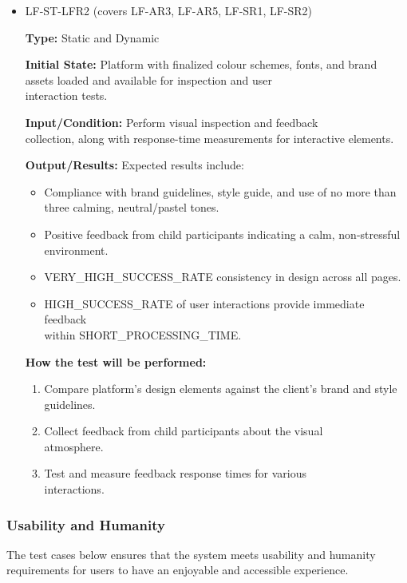 \documentclass[12pt, titlepage]{article}
\begin{document}
\begin{itemize}
  \item LF-ST-LFR2 (covers LF-AR3, LF-AR5, LF-SR1, LF-SR2)
  \begin{mdframed}[linewidth=0.5mm] 
    \textbf{Type:} Static and Dynamic \par 
    \textbf{Initial State:} Platform with finalized colour schemes, fonts, and brand assets loaded and available for inspection and user \\interaction tests. \par 
    \textbf{Input/Condition:} Perform visual inspection and feedback \\collection, along with response-time measurements for interactive elements. \par 
    \textbf{Output/Results:} Expected results include: 
    \begin{itemize} 
      \item Compliance with brand guidelines, style guide, and use of no more than three calming, neutral/pastel tones. 
      \item Positive feedback from child participants indicating a calm, non-stressful environment. 
      \item VERY\_HIGH\_SUCCESS\_RATE consistency in design across all pages. 
      \item HIGH\_SUCCESS\_RATE of user interactions provide immediate feedback \\ within SHORT\_PROCESSING\_TIME. 
    \end{itemize} \par 
    \textbf{How the test will be performed:} 
    \begin{enumerate}[noitemsep] 
      \item Compare platform’s design elements against the client’s brand and style guidelines. 
      \item Collect feedback from child participants about the visual \\atmosphere. 
      \item Test and measure feedback response times for various \\interactions. 
    \end{enumerate} 
  \end{mdframed} 
\end{itemize}

\subsubsection{Usability and Humanity}
\hspace{2em}The test cases below ensures that the system meets usability and humanity
requirements for users to have an enjoyable and accessible experience.
\end{document}
